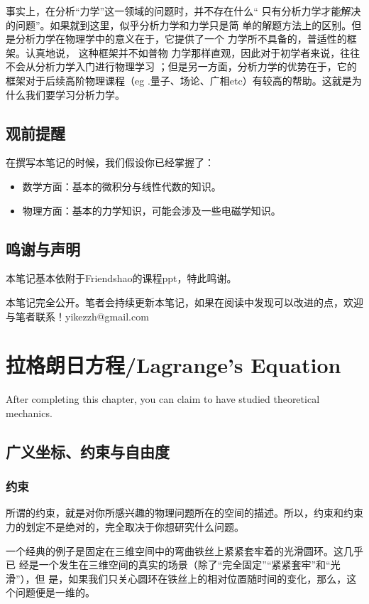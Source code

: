 \documentclass[a4paper, 10pt, openany]{book}%
\begin{document}
事实上，在分析“力学”这一领域的问题时，并不存在什么“
只有分析力学才能解决的问题”。如果就到这里，似乎分析力学和力学只是简
单的解题方法上的区别。但是分析力学在物理学中的意义在于，它提供了一个
力学所不具备的，普适性的框架。认真地说， 这种框架并不如普物
力学那样直观，因此对于初学者来说，往往不会从分析力学入门进行物理学习
；但是另一方面，分析力学的优势在于，它的框架对于后续高阶物理课程（eg
.量子、场论、广相etc）有较高的帮助。这就是为什么我们要学习分析力学。
\section{观前提醒}
在撰写本笔记的时候，我们假设你已经掌握了：
\begin{itemize}

\item 数学方面：基本的微积分与线性代数的知识。

\item 物理方面：基本的力学知识，可能会涉及一些电磁学知识。

\end{itemize}
\section{鸣谢与声明}
本笔记基本依附于Friendshao的课程ppt，特此鸣谢。

本笔记完全公开。笔者会持续更新本笔记，如果在阅读中发现可以改进的点，欢迎
与笔者联系！yikezzh@gmail.com

\newpage
\chapter{拉格朗日方程/Lagrange's Equation}
After completing this chapter, you can claim to have studied theoretical mechanics.
\section{广义坐标、约束与自由度}
\subsection{约束}
所谓的约束，就是对你所感兴趣的物理问题所在的空间的描述。所以，约束和约束力的划定不是绝对的，完全取决于你想研究什么问题。

一个经典的例子是固定在三维空间中的弯曲铁丝上紧紧套牢着的光滑圆环。这几乎已
经是一个发生在三维空间的真实的场景（除了“完全固定”“紧紧套牢”和“光滑”），但
是，如果我们只关心圆环在铁丝上的相对位置随时间的变化，那么，这个问题便是一维的。
\end{document}
